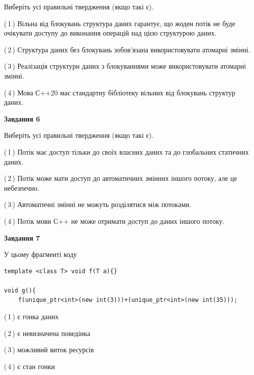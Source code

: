\documentclass[12pt, ukrainian]{article}
\begin{document}
\begin {large}
{Виберіть усі правильні твердження (якщо такі є).\par
\vspace{2mm}

(\,1\,) Вільна від блокувань структура даних гарантує, що жоден потік не буде очікувати доступу до виконання операцій над цією структурою даних.%

(\,2\,) Структура даних без блокувань зобов’язана використовувати атомарні змінні.%

(\,3\,) Реалізація структури даних з блокуваннями може використовувати атомарні змінні.%

(\,4\,) Мова С++20 має стандартну бібліотеку вільних від блокувань структур даних.%
\newpage


\begin{center}
\textbf{Завдання 6}
\end{center}

Виберіть усі правильні твердження (якщо такі є).\par
\vspace{2mm}

(\,1\,) Потік має доступ тільки до своїх власних даних та до глобальних статичних даних.%

(\,2\,) Потік може мати доступ до автоматичних змінних іншого потоку, але це небезпечно.%

(\,3\,) Автоматичні змінні не можуть розділятися між потоками.%

(\,4\,) Потік мови С++ не може отримати доступ до даних іншого потоку.%


\begin{center}
\textbf{Завдання 7}
\end{center}

У цьому фрагменті коду
\begin{verbatim}
template <class T> void f(T a){}

void g(){
    f(unique_ptr<int>(new int(3)))+(unique_ptr<int>(new int(35)));
\end{verbatim}

(\,1\,) є гонка даних%

(\,2\,) є невизначена поведінка%

(\,3\,) можливий виток ресурсів%

(\,4\,) є стан гонки%

}
\end {large}

\vspace{4mm}
\newpage
\end{document}
